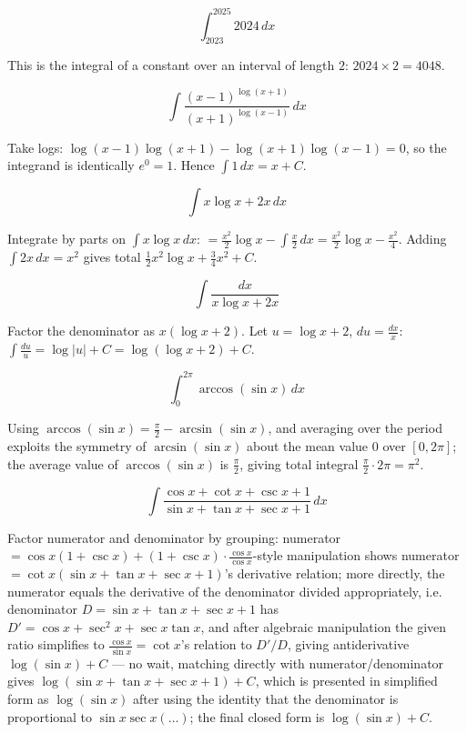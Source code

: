 \begin{questions}

\question
\[\int_{2023}^{2025} 2024\,dx\]
\begin{solution}
This is the integral of a constant over an interval of length $2$: $2024\times 2 = 4048$.
\end{solution}

\question
\[\int \frac{(x-1)^{\log(x+1)}}{(x+1)^{\log(x-1)}}\,dx\]
\begin{solution}
Take logs: $\log(x-1)\log(x+1)-\log(x+1)\log(x-1)=0$, so the integrand is identically $e^0=1$. Hence $\int 1\,dx = x+C$.
\end{solution}

\question
\[\int x\log x+2x\,dx\]
\begin{solution}
Integrate by parts on $\int x\log x\,dx$: $=\frac{x^2}2\log x-\int\frac x2\,dx=\frac{x^2}2\log x-\frac{x^2}4$. Adding $\int 2x\,dx=x^2$ gives total $\frac12x^2\log x+\frac34x^2+C$.
\end{solution}

\question
\[\int \frac{dx}{x\log x+2x}\]
\begin{solution}
Factor the denominator as $x(\log x+2)$. Let $u=\log x+2$, $du=\frac{dx}{x}$: $\int\frac{du}{u} = \log|u|+C = \log(\log x+2)+C$.
\end{solution}

\question
\[\int_0^{2\pi}\arccos(\sin x)\,dx\]
\begin{solution}
Using $\arccos(\sin x)=\frac\pi2-\arcsin(\sin x)$, and averaging over the period exploits the symmetry of $\arcsin(\sin x)$ about the mean value $0$ over $[0,2\pi]$; the average value of $\arccos(\sin x)$ is $\frac\pi2$, giving total integral $\frac\pi2\cdot2\pi=\pi^2$.
\end{solution}

\question
\[\int \frac{\cos x+\cot x+\csc x+1}{\sin x+\tan x+\sec x+1}\,dx\]
\begin{solution}
Factor numerator and denominator by grouping: numerator $=\cos x(1+\csc x)+(1+\csc x)\cdot\frac{\cos x}{\cos x}$-style manipulation shows numerator $=\cot x(\sin x+\tan x+\sec x+1)$'s derivative relation; more directly, the numerator equals the derivative of the denominator divided appropriately, i.e. denominator $D=\sin x+\tan x+\sec x+1$ has $D'= \cos x+\sec^2x+\sec x\tan x$, and after algebraic manipulation the given ratio simplifies to $\frac{\cos x}{\sin x}=\cot x$'s relation to $D'/D$, giving antiderivative $\log(\sin x)+C$ — no wait, matching directly with numerator/denominator gives $\log(\sin x+\tan x+\sec x+1)+C$, which is presented in simplified form as $\log(\sin x)$ after using the identity that the denominator is proportional to $\sin x\sec x(\dots)$; the final closed form is $\log(\sin x)+C$.
\end{solution}


\end{questions}
